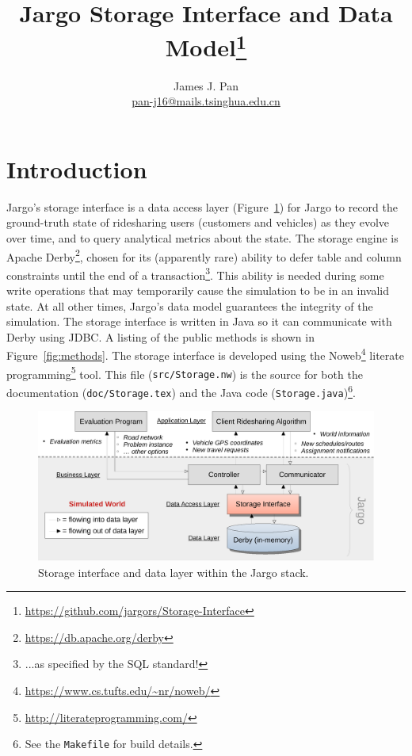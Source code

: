 \documentclass{article}
\title{Jargo Storage Interface and Data Model\footnote{
  \url{https://github.com/jargors/Storage-Interface}}}
\author{James J. Pan\\
  \small{\href{mailto:pan-j16@mails.tsinghua.edu.cn}{pan-j16@mails.tsinghua.edu.cn}}}
\theoremstyle{definition}                   %
\begin{document}
\maketitle
\pagestyle{noweb}

\tableofcontents

\section{Introduction}
\label{sec:introduction}
Jargo's storage interface is a data access layer (Figure~\ref{fig:storage}) for
Jargo to record the ground-truth state of ridesharing users (customers and
vehicles) as they evolve over time, and to query analytical metrics about the
state.  The storage engine is Apache
Derby\footnote{\url{https://db.apache.org/derby}}, chosen for its (apparently
rare) ability to defer table and column constraints until the end of a
transaction\footnote{...as specified by the SQL standard!}.  This ability is
needed during some write operations that may temporarily cause the simulation
to be in an invalid state. At all other times, Jargo's data model guarantees
the integrity of the simulation. The storage interface is written in Java so it
can communicate with Derby using JDBC. A listing of the public methods is shown
in Figure~\ref{fig:methods}.  The storage interface is developed using the
Noweb\footnote{\url{https://www.cs.tufts.edu/~nr/noweb/}} literate
programming\footnote{\url{http://literateprogramming.com/}} tool.  This file
({\tt{}src/Storage.nw}) is the source for both the documentation
({\tt{}doc/Storage.tex}) and the Java code ({\tt{}Storage.java})\footnote{See the
{\tt{}Makefile} for build details.}.

\begin{figure}[h]
\centering
\includegraphics[width=150mm]{src/fig/storage-fig}
\caption{Storage interface and data layer within the Jargo stack.}
\label{fig:storage}
\end{figure}
\end{document}
